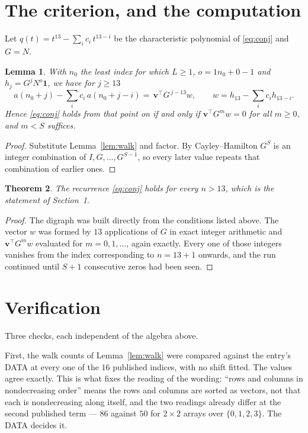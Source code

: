 \documentclass[11pt,a4paper]{article}
\theoremstyle{plain}
\newtheorem{theorem}{Theorem}
\newtheorem{lemma}[theorem]{Lemma}
\theoremstyle{definition}
\begin{document}
\section{The criterion, and the computation}

Let $q(t)=t^{13}-\sum_i c_i\,t^{13-i}$ be the characteristic polynomial of
\eqref{eq:conj} and $G=N$.

\begin{lemma}\label{lem:crit}
With $n_0$ the least index for which $L\ge1$, $o=1n_0+0-1$ and
$h_j=G^{j}N^{o}\mathbf{1}$, we have for $j\ge13$
\[
a(n_0+j)-\sum_i c_i\,a(n_0+j-i)=\,\mathbf{v}^{\!\top}G^{\,j-13}w,
\qquad w=h_{13}-\sum_i c_ih_{13-i} .
\]
Hence \eqref{eq:conj} holds from that point on if and only if
$\mathbf{v}^{\!\top}G^{m}w=0$ for all $m\ge0$, and $m<S$ suffices.
\end{lemma}

\begin{proof}
Substitute Lemma~\ref{lem:walk} and factor. By Cayley--Hamilton $G^{S}$ is an integer
combination of $I,G,\dots,G^{S-1}$, so every later value repeats that combination of
earlier ones.
\end{proof}

\begin{theorem}
The recurrence \eqref{eq:conj} holds for every $n>13$, which is the statement of
Section~1.
\end{theorem}

\begin{proof}
The digraph was built directly from the conditions listed above. The vector $w$ was formed by
$13$ applications of $G$ in exact integer arithmetic and $\mathbf{v}^{\!\top}G^{m}w$
evaluated for $m=0,1,\dots$, again exactly. Every one of those integers vanishes from the
index corresponding to $n=13+1$ onwards, and the run continued until $S+1$ consecutive
zeros had been seen.
\end{proof}

\section{Verification}

Three checks, each independent of the algebra above.

First, the walk counts of Lemma~\ref{lem:walk} were compared against the entry's DATA at
every one of the $16$ published indices, with no shift fitted. The values agree exactly.
This is what fixes the reading of the wording: ``rows and columns in nondecreasing order''
means the rows and columns are sorted as vectors, not that each is nondecreasing along
itself, and the two readings already differ at the second published term --- $86$ against
$50$ for $2\times2$ arrays over $\{0,1,2,3\}$. The DATA decides it.
\end{document}
